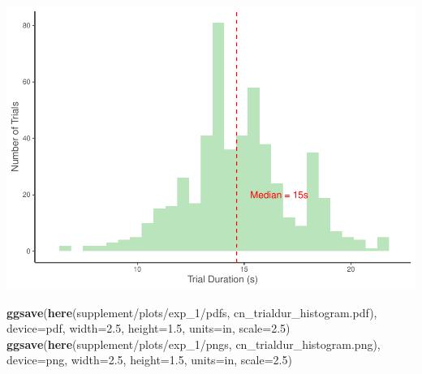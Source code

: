\documentclass[
  doc,floatsintext]{apa6}
\newenvironment{Shaded}{\begin{snugshade}}{\end{snugshade}}
\newcommand{\AttributeTok}[1]{\textcolor[rgb]{0.13,0.29,0.53}{#1}}
\newcommand{\FloatTok}[1]{\textcolor[rgb]{0.00,0.00,0.81}{#1}}
\newcommand{\FunctionTok}[1]{\textcolor[rgb]{0.13,0.29,0.53}{\textbf{#1}}}
\newcommand{\NormalTok}[1]{#1}
\newcommand{\StringTok}[1]{\textcolor[rgb]{0.31,0.60,0.02}{#1}}
\begin{document}
\includegraphics{revised_ms_analyses_files/figure-latex/r2-cn-durations-trial-1.pdf}

\begin{Shaded}
\begin{Highlighting}[]
\FunctionTok{ggsave}\NormalTok{(}\FunctionTok{here}\NormalTok{(}\StringTok{\textquotesingle{}supplement/plots/exp\_1/pdfs\textquotesingle{}}\NormalTok{, }\StringTok{\textquotesingle{}cn\_trialdur\_histogram.pdf\textquotesingle{}}\NormalTok{), }
       \AttributeTok{device=}\StringTok{\textquotesingle{}pdf\textquotesingle{}}\NormalTok{, }\AttributeTok{width=}\FloatTok{2.5}\NormalTok{, }\AttributeTok{height=}\FloatTok{1.5}\NormalTok{, }\AttributeTok{units=}\StringTok{\textquotesingle{}in\textquotesingle{}}\NormalTok{, }\AttributeTok{scale=}\FloatTok{2.5}\NormalTok{)}
\FunctionTok{ggsave}\NormalTok{(}\FunctionTok{here}\NormalTok{(}\StringTok{\textquotesingle{}supplement/plots/exp\_1/pngs\textquotesingle{}}\NormalTok{, }\StringTok{\textquotesingle{}cn\_trialdur\_histogram.png\textquotesingle{}}\NormalTok{), }
       \AttributeTok{device=}\StringTok{\textquotesingle{}png\textquotesingle{}}\NormalTok{, }\AttributeTok{width=}\FloatTok{2.5}\NormalTok{, }\AttributeTok{height=}\FloatTok{1.5}\NormalTok{, }\AttributeTok{units=}\StringTok{\textquotesingle{}in\textquotesingle{}}\NormalTok{, }\AttributeTok{scale=}\FloatTok{2.5}\NormalTok{)}
\end{Highlighting}
\end{Shaded}
\end{document}
